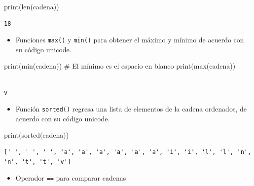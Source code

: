 \documentclass[
  spanish,
  letterpaper,
]{scrbook}
\newenvironment{Shaded}{\begin{snugshade}}{\end{snugshade}}
\newcommand{\BuiltInTok}[1]{\textcolor[rgb]{0.00,0.23,0.31}{#1}}
\newcommand{\CommentTok}[1]{\textcolor[rgb]{0.37,0.37,0.37}{#1}}
\newcommand{\NormalTok}[1]{\textcolor[rgb]{0.00,0.23,0.31}{#1}}
\providecommand{\tightlist}{%
  \setlength{\itemsep}{0pt}\setlength{\parskip}{0pt}}
\theoremstyle{definition}
\theoremstyle{remark}
\begin{document}
\begin{Shaded}
\begin{Highlighting}[]
\BuiltInTok{print}\NormalTok{(}\BuiltInTok{len}\NormalTok{(cadena))}
\end{Highlighting}
\end{Shaded}

\begin{verbatim}
18
\end{verbatim}

\begin{itemize}
\tightlist
\item
  Funciones \texttt{max()} y \texttt{min()} para obtener el máximo y
  mínimo de acuerdo con su código unicode.
\end{itemize}

\begin{Shaded}
\begin{Highlighting}[]
\BuiltInTok{print}\NormalTok{(}\BuiltInTok{min}\NormalTok{(cadena)) }\CommentTok{\# El mínimo es el espacio en blanco}
\BuiltInTok{print}\NormalTok{(}\BuiltInTok{max}\NormalTok{(cadena))}
\end{Highlighting}
\end{Shaded}

\begin{verbatim}
 
v
\end{verbatim}

\begin{itemize}
\tightlist
\item
  Función \texttt{sorted()} regresa una lista de elementos de la cadena
  ordenados, de acuerdo con su código unicode.
\end{itemize}

\begin{Shaded}
\begin{Highlighting}[]
\BuiltInTok{print}\NormalTok{(}\BuiltInTok{sorted}\NormalTok{(cadena))}
\end{Highlighting}
\end{Shaded}

\begin{verbatim}
[' ', ' ', ' ', 'a', 'a', 'a', 'a', 'a', 'a', 'i', 'i', 'l', 'l', 'n', 'n', 't', 't', 'v']
\end{verbatim}

\begin{itemize}
\tightlist
\item
  Operador \texttt{==} para comparar cadenas
\end{itemize}
\end{document}
